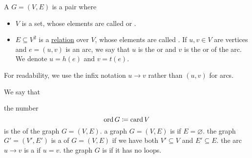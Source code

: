 \begin{definition}\label{def:directed_graph}
  A  \( G = (V, E) \) is a pair where
  \begin{itemize}
    \item \( V \) is a set, whose elements are called  or .
    \item \( E \subseteq V^2 \) is a \hyperref[def:relation]{relation} over \( V \), whose elements are called . If \( u, v \in V \) are vertices and \( e = (u, v) \) is an arc, we say that \( u \) is the  or  and \( v \) is the  or  of the arc. We denote \( u = h(e) \) and \( v = t(e) \).
  \end{itemize}

  For readability, we use the infix notation \( u \to v \) rather than \( (u, v) \) for arcs.

  We say that
  \begin{thmenum}
     the number
    \begin{equation*}
      \operatorname{ord} G \coloneqq \operatorname{card} V
    \end{equation*}
    is the  of the graph \( G = (V, E) \).
     a graph \( G = (V, E) \) is  if \( E = \varnothing \).
     the graph \( G' = (V', E') \) is a  of \( G = (V, E) \) if we have both \( V' \subseteq V \) and \( E' \subseteq E \).
     the arc \( u \to v \) is a  if \( u = v \).
    the graph \( G \) is  if it has no loops.
  \end{thmenum}
\end{definition}

\medskip

